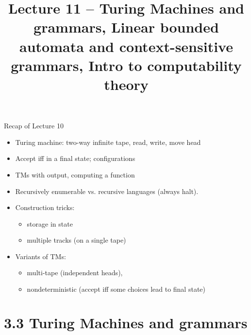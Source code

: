 \documentclass[handout]{beamer}
\title{Lecture 11 -- Turing Machines and grammars, Linear bounded automata and context-sensitive grammars, Intro to computability theory}
\begin{document}
\frame{\titlepage}


\begin{frame}{Recap of Lecture 10}
	
    \begin{itemize}        
        \item Turing machine: two-way infinite tape, read, write, move head
        \item Accept iff in a final state; configurations
        \item TMs with output, computing a function
        \item Recursively enumerable vs. recursive languages (always halt).
        \item Construction tricks: 
        \begin{itemize}
            \item storage in state
            \item multiple tracks (on a single tape)
        \end{itemize}
        \item Variants of TMs: 
        \begin{itemize}
            \item multi-tape (independent heads),
            \item nondeterministic (accept iff some choices lead to final state)
        \end{itemize}  
    \end{itemize}
	
\end{frame}


\section{3.3 Turing Machines and grammars}
\end{document}
